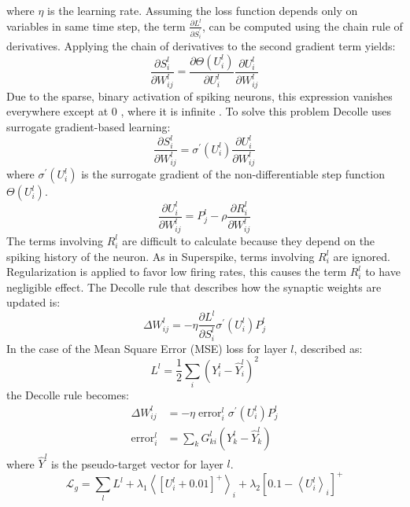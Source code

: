 \documentclass[12pt]{report}
\begin{document}
where $\eta$ is the learning rate. Assuming the loss function depends only on variables in same time step, the term $\frac{\partial L^{l}}{\partial S_{i}^{\prime}}$, can be computed using the chain rule of derivatives. Applying the chain of derivatives to the second gradient term yields:
\begin{equation}
\frac{\partial S_{i}^{l}}{\partial W_{i j}^{l}}=\frac{\partial \Theta\left(U_{i}^{l}\right)}{\partial U_{i}^{l}} \frac{\partial U_{i}^{l}}{\partial W_{i j}^{l}}
\end{equation}
Due to the sparse, binary activation of spiking neurons, this expression vanishes everywhere except at 0 , where it is infinite . To solve this problem Decolle uses surrogate gradient-based learning:
\begin{equation}
\frac{\partial S_{i}^{l}}{\partial W_{i j}^{l}}=\sigma^{\prime}\left(U_{i}^{l}\right) \frac{\partial U_{i}^{l}}{\partial W_{i j}^{l}}
\end{equation}
where $\sigma^{\prime}\left(U_{i}^{l}\right)$ is the surrogate gradient of the non-differentiable step function $\Theta\left(U_{i}^{l}\right)$.
\begin{equation}
\frac{\partial U_{i}^{l}}{\partial W_{i j}^{l}}=P_{j}^{l}-\rho \frac{\partial R_{i}^{l}}{\partial W_{i j}^{l}}
\end{equation}
The terms involving $R_{i}^{l}$ are difficult to calculate because they depend on the spiking history of the neuron. As in Superspike,  terms involving $R_{i}^{l}$ are ignored. Regularization is applied to favor low firing rates, this causes the term $R_{i}^{l}$ to have negligible effect. The Decolle rule that describes how the synaptic weights are updated is:
\begin{equation}
\Delta W_{i j}^{l}=-\eta \frac{\partial L^{l}}{\partial S_{i}^{l}} \sigma^{\prime}\left(U_{i}^{l}\right) P_{j}^{l}
\end{equation}
In the case of the Mean Square Error (MSE) loss for layer $l$, described as:
\begin{equation}
L^{l}=\frac{1}{2} \sum_{i}\left(Y_{i}^{l}-\hat{Y}_{i}^{l}\right)^{2}
\end{equation}
the Decolle rule becomes:
\begin{equation}
\begin{aligned}
\Delta W_{i j}^{l} &=-\eta \operatorname{error}_{i}^{l} \sigma^{\prime}\left(U_{i}^{l}\right) P_{j}^{l} \\
\operatorname{error}_{i}^{l} &=\sum_{k} G_{k i}^{l}\left(Y_{k}^{l}-\hat{Y}_{k}^{l}\right)
\end{aligned}
\end{equation}
where $\hat{Y}^{l}$ is the pseudo-target vector for layer $l$.
\begin{equation}
\mathcal{L}_{g}=\sum_{l} L^{l}+\lambda_{1}\left\langle\left[U_{i}^{l}+0.01\right]^{+}\right\rangle_{i}+\lambda_{2}\left[0.1-\left\langle U_{i}^{l}\right\rangle_{i}\right]^{+}
\end{equation}
\end{document}
